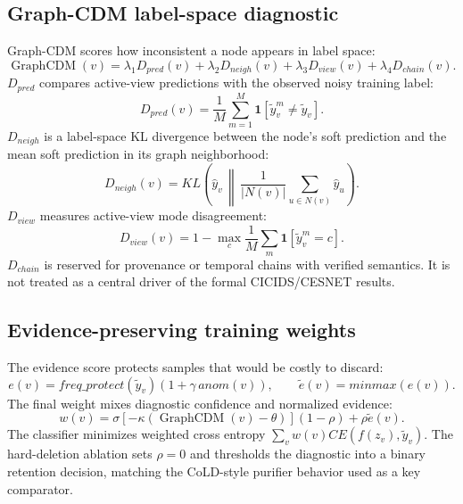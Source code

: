 \documentclass[preprint,review,12pt]{elsarticle}
\begin{document}
\subsection{Graph-CDM label-space diagnostic}
Graph-CDM scores how inconsistent a node appears in label space:
\begin{equation}
\operatorname{GraphCDM}(v)=
\lambda_1D_{pred}(v)+\lambda_2D_{neigh}(v)+
\lambda_3D_{view}(v)+\lambda_4D_{chain}(v).
\end{equation}
$D_{pred}$ compares active-view predictions with the observed noisy training label:
\begin{equation}
D_{pred}(v)=\frac{1}{M}\sum_{m=1}^M
\mathbf{1}\left[\tilde y_v^m \ne \tilde y_v\right].
\end{equation}
$D_{neigh}$ is a label-space KL divergence between the node's soft prediction
and the mean soft prediction in its graph neighborhood:
\begin{equation}
D_{neigh}(v)=KL\left(\hat y_v\,\middle\|\,\frac{1}{|N(v)|}\sum_{u\in N(v)}\hat y_u\right).
\end{equation}
$D_{view}$ measures active-view mode disagreement:
\begin{equation}
D_{view}(v)=1-\max_c \frac{1}{M}\sum_m \mathbf{1}\left[\tilde y_v^m=c\right].
\end{equation}
$D_{chain}$ is reserved for provenance or temporal chains with verified
semantics. It is not treated as a central driver of the formal CICIDS/CESNET
results.

\subsection{Evidence-preserving training weights}
The evidence score protects samples that would be costly to discard:
\begin{equation}
e(v)=freq\_protect(\tilde y_v)\left(1+\gamma\,anom(v)\right),\qquad
\tilde e(v)=minmax(e(v)).
\end{equation}
The final weight mixes diagnostic confidence and normalized evidence:
\begin{equation}
w(v)=\sigma\left[-\kappa(\operatorname{GraphCDM}(v)-\theta)\right](1-\rho)
+\rho\tilde e(v).
\end{equation}
The classifier minimizes weighted cross entropy
$\sum_v w(v)CE(f(z_v),\tilde y_v)$. The hard-deletion ablation sets $\rho=0$ and
thresholds the diagnostic into a binary retention decision, matching the
CoLD-style purifier behavior used as a key comparator.
\end{document}
